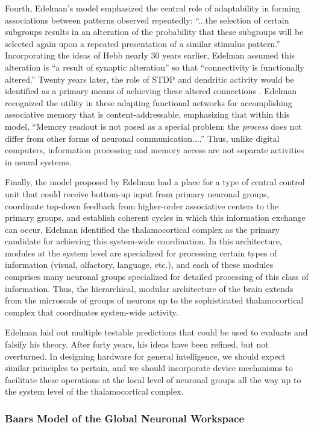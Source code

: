 Fourth, Edelman's model emphasized the central role of adaptability in forming associations between patterns observed repeatedly: ``...the selection of certain subgroups results in an alteration of the probability that these subgroups will be selected again upon a repeated presentation of a similar stimulus pattern.'' Incorporating the ideas of Hebb nearly 30 years earlier, Edelman assumed this alteration is ``a result of synaptic alteration'' so that ``connectivity is functionally altered.'' Twenty years later, the role of STDP and dendritic activity would be identified as a primary means of achieving these altered connections \cite{bipo1998,pome2001}. Edelman recognized the utility in these adapting functional networks for accomplishing associative memory that is content-addressable, emphasizing that within this model, ``Memory readout is not posed as a special problem; the \textit{process} does not differ from other forms of neuronal communication....'' Thus, unlike digital computers, information processing and memory access are not separate activities in neural systems.

Finally, the model proposed by Edelman had a place for a type of central control unit that could receive bottom-up input from primary neuronal groups, coordinate top-down feedback from higher-order associative centers to the primary groups, and establish coherent cycles in which this information exchange can occur. Edelman identified the thalamocortical complex as the primary candidate for achieving this system-wide coordination. In this architecture, modules at the system level are specialized for processing certain types of information (visual, olfactory, language, etc.), and each of these modules comprises many neuronal groups specialized for detailed  processing of this class of information. Thus, the hierarchical, modular architecture of the brain extends from the microscale of groups of neurons up to the sophisticated thalamocortical complex that coordinates system-wide activity. 

Edelman laid out multiple testable predictions that could be used to evaluate and falsify his theory. After forty years, his ideas have been refined, but not overturned. In designing hardware for general intelligence, we should expect similar principles to pertain, and we should incorporate device mechanisms to facilitate these operations at the local level of neuronal groups all the way up to the system level of the thalamocortical complex.

\subsubsection{Baars Model of the Global Neuronal Workspace}

